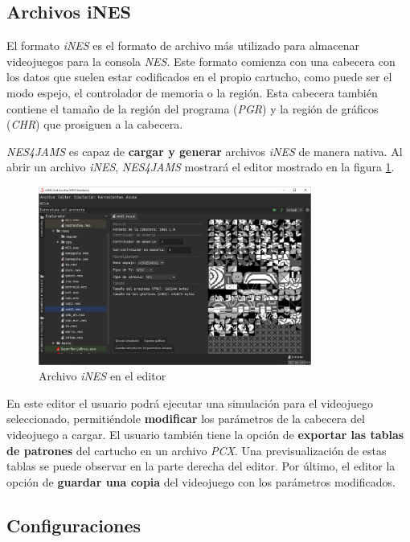 \subsection{Archivos iNES}\label{subsec:archivos-nes}

El formato \textit{iNES} es el formato de archivo más utilizado
para almacenar videojuegos para la consola \textit{NES}.
Este formato comienza con una cabecera con los datos que suelen
estar codificados en el propio cartucho, como puede ser el modo
espejo, el controlador de memoria o la región.
Esta cabecera también contiene el tamaño de la región del
programa (\textit{PGR}) y la región de gráficos (\textit{CHR})
que prosiguen a la cabecera.

\textit{NES4JAMS} es capaz de \textbf{cargar y generar} archivos
\textit{iNES} de manera nativa.
Al abrir un archivo \textit{iNES}, \textit{NES4JAMS} mostrará
el editor mostrado en la figura \ref{fig:nes-ines-editor}.

\begin{figure}[h]
    \centering
    \includegraphics[width=0.8\textwidth]{images/nes/nes-ines-editor}
    \caption{Archivo \textit{iNES} en el editor}
    \label{fig:nes-ines-editor}
\end{figure}

En este editor el usuario podrá ejecutar una simulación
para el videojuego seleccionado, permitiéndole \textbf{modificar}
los parámetros de la cabecera del videojuego a cargar.
El usuario también tiene la opción de \textbf{exportar las tablas
de patrones} del cartucho en un archivo \textit{PCX}.
Una previsualización de estas tablas se puede observar en la parte
derecha del editor.
Por último, el editor  la opción de \textbf{guardar una copia}
del videojuego con los parámetros modificados.

\subsection{Configuraciones}\label{subsec:configuraciones}

